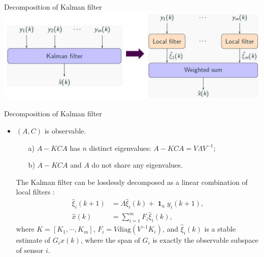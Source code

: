 \documentclass[10pt]{beamer}
\newcommand{\diag}{\text{diag}}
\DeclareMathOperator{\1}{\textbf{1}}
\begin{document}
\begin{frame}{Decomposition of Kalman filter}
  \centering
  \includegraphics[width=1.0\textwidth]{pic/decomp}
\end{frame}

\begin{frame}{Decomposition of Kalman filter}
  \begin{itemize}
    \item $(A,C)$ is observable.
      \begin{itemize}
	\item[a)] $A-KCA$ has {\color{thupurple} $n$ distinct} eigenvalues: $A-KCA=V\Lambda V^{-1}$;
	\item[b)] $A-KCA$ and $A$ {\color{thupurple}do not share} any eigenvalues.
      \end{itemize}
      \begin{theorem}

	The Kalman filter can be losslessly decomposed as a linear combination of local filters :
	\begin{align*}
	  \hat \xi_i(k+1)&=\Lambda\hat \xi_i(k)+\1_ny_i(k+1),\\
	  \hat x(k)&=\sum_{i=1}^m F_i\hat \xi_i(k),
	\end{align*}
	where $K=[K_1,\cdots,K_m]$, $F_i=V \diag(V^{-1}K_i)$, and $\hat\xi_i(k)$ is a stable estimate of $G_ix(k)$, where the span of $G_i$ is exactly the observable subspace of sensor $i$.
      \end{theorem}
  \end{itemize}
\end{frame}
\end{document}
